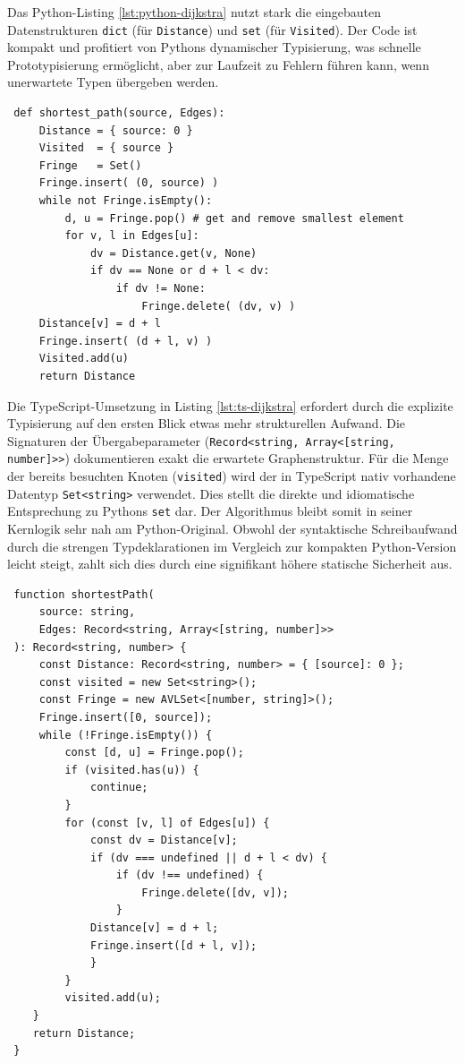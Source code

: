 Das Python-Listing \ref{lst:python-dijkstra} nutzt stark die eingebauten Datenstrukturen \texttt{dict} (für \texttt{Distance}) und \texttt{set} (für \texttt{Visited}). Der Code ist kompakt und profitiert von Pythons dynamischer Typisierung, was schnelle Prototypisierung ermöglicht, aber zur Laufzeit zu Fehlern führen kann, wenn unerwartete Typen übergeben werden.
\begin{verbatim}
 def shortest_path(source, Edges):
     Distance = { source: 0 }
     Visited  = { source }
     Fringe   = Set()
     Fringe.insert( (0, source) )
     while not Fringe.isEmpty():
         d, u = Fringe.pop() # get and remove smallest element
         for v, l in Edges[u]:
             dv = Distance.get(v, None)
             if dv == None or d + l < dv:
                 if dv != None: 
                     Fringe.delete( (dv, v) )
     Distance[v] = d + l
     Fringe.insert( (d + l, v) )
     Visited.add(u)
     return Distance
\end{verbatim}
\label{lst:python-dijkstra}

Die TypeScript-Umsetzung in Listing \ref{lst:ts-dijkstra} erfordert durch die explizite Typisierung auf den ersten Blick etwas mehr strukturellen Aufwand. Die Signaturen der Übergabeparameter (\texttt{Record<string, Array<[string, number]>>}) dokumentieren exakt die erwartete Graphenstruktur. Für die Menge der bereits besuchten Knoten (\texttt{visited}) wird der in TypeScript nativ vorhandene Datentyp \texttt{Set<string>} verwendet. Dies stellt die direkte und idiomatische Entsprechung zu Pythons \texttt{set} dar. Der Algorithmus bleibt somit in seiner Kernlogik sehr nah am Python-Original. Obwohl der syntaktische Schreibaufwand durch die strengen Typdeklarationen im Vergleich zur kompakten Python-Version leicht steigt, zahlt sich dies durch eine signifikant höhere statische Sicherheit aus.
\begin{verbatim}
 function shortestPath(
     source: string,
     Edges: Record<string, Array<[string, number]>>
 ): Record<string, number> {
     const Distance: Record<string, number> = { [source]: 0 };
     const visited = new Set<string>();
     const Fringe = new AVLSet<[number, string]>();
     Fringe.insert([0, source]);
     while (!Fringe.isEmpty()) {
         const [d, u] = Fringe.pop();
         if (visited.has(u)) {
             continue;
         }
         for (const [v, l] of Edges[u]) {
             const dv = Distance[v];
             if (dv === undefined || d + l < dv) {
                 if (dv !== undefined) {
                     Fringe.delete([dv, v]);
                 }
             Distance[v] = d + l;
             Fringe.insert([d + l, v]);
             }
         }
         visited.add(u);
    }
    return Distance;
 }
\end{verbatim}
\label{lst:ts-dijkstra}

